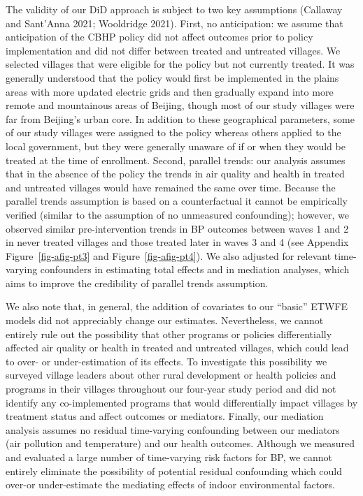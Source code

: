 \documentclass[
  letterpaper,
  DIV=11,
  numbers=noendperiod]{scrartcl}
\begin{document}
The validity of our DiD approach is subject to two key assumptions
(Callaway and Sant'Anna 2021; Wooldridge 2021). First, no anticipation:
we assume that anticipation of the CBHP policy did not affect outcomes
prior to policy implementation and did not differ between treated and
untreated villages. We selected villages that were eligible for the
policy but not currently treated. It was generally understood that the
policy would first be implemented in the plains areas with more updated
electric grids and then gradually expand into more remote and
mountainous areas of Beijing, though most of our study villages were far
from Beijing's urban core. In addition to these geographical parameters,
some of our study villages were assigned to the policy whereas others
applied to the local government, but they were generally unaware of if
or when they would be treated at the time of enrollment. Second,
parallel trends: our analysis assumes that in the absence of the policy
the trends in air quality and health in treated and untreated villages
would have remained the same over time. Because the parallel trends
assumption is based on a counterfactual it cannot be empirically
verified (similar to the assumption of no unmeasured confounding);
however, we observed similar pre-intervention trends in BP outcomes
between waves 1 and 2 in never treated villages and those treated later
in waves 3 and 4 (see Appendix Figure~\ref{fig-afig-pt3} and
Figure~\ref{fig-afig-pt4}). We also adjusted for relevant time-varying
confounders in estimating total effects and in mediation analyses, which
aims to improve the credibility of parallel trends assumption.

We also note that, in general, the addition of covariates to our
``basic'' ETWFE models did not appreciably change our estimates.
Nevertheless, we cannot entirely rule out the possibility that other
programs or policies differentially affected air quality or health in
treated and untreated villages, which could lead to over- or
under-estimation of its effects. To investigate this possibility we
surveyed village leaders about other rural development or health
policies and programs in their villages throughout our four-year study
period and did not identify any co-implemented programs that would
differentially impact villages by treatment status and affect outcomes
or mediators. Finally, our mediation analysis assumes no residual
time-varying confounding between our mediators (air pollution and
temperature) and our health outcomes. Although we measured and evaluated
a large number of time-varying risk factors for BP, we cannot entirely
eliminate the possibility of potential residual confounding which could
over-or under-estimate the mediating effects of indoor environmental
factors.
\end{document}
